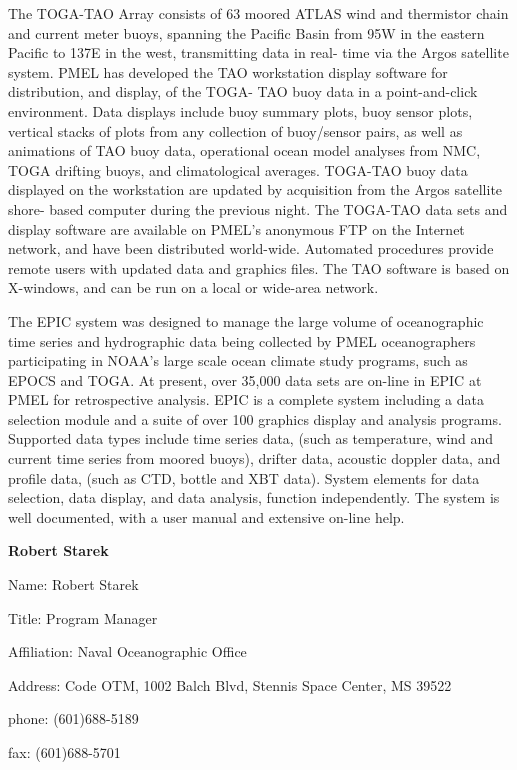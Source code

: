 	The TOGA-TAO Array consists of 63 moored ATLAS wind and 
thermistor chain and current meter buoys, spanning the Pacific Basin from 
95W in the eastern Pacific to 137E in the west, transmitting data in real-
time via the Argos satellite system.  PMEL has developed the TAO 
workstation display software for distribution, and display, of the TOGA-
TAO buoy data in a point-and-click environment.  Data displays include 
buoy summary plots, buoy sensor plots, vertical stacks of plots from any 
collection of buoy/sensor pairs, as well as animations of TAO buoy data, 
operational ocean model analyses from NMC, TOGA drifting buoys, and 
climatological averages.  TOGA-TAO buoy data displayed on the 
workstation are updated by acquisition from the Argos satellite shore-
based computer during the previous night.  The TOGA-TAO data sets and 
display software are available on PMEL's anonymous FTP on the Internet 
network, and have been distributed world-wide.  Automated procedures 
provide remote users with updated data and graphics files. The TAO 
software is based on X-windows, and can be run on a local or wide-area 
network.


\bigskip
{}
\bigskip


	The EPIC system was designed to manage the large volume of 
oceanographic time series and hydrographic data being collected by PMEL 
oceanographers participating in NOAA's large scale ocean climate study 
programs, such as EPOCS and TOGA.  At present, over 35,000 data sets are 
on-line in EPIC at PMEL for retrospective analysis.  EPIC is a complete 
system including a data selection module and a suite of over 100 graphics 
display and analysis programs.  Supported data types include time series 
data, (such as temperature, wind and current time series from moored 
buoys), drifter data, acoustic doppler data, and profile data, (such as CTD, 
bottle and XBT data).  System elements for data selection, data display, 
and data analysis, function independently.  The system is well 
documented, with a user manual and extensive on-line help.
\newpage

\begin{center}
\LARGE
{\bf  Robert Starek}
\end{center}
\large
{}
\normalsize
\smallskip
\begin{description}
\item{Name:}  Robert Starek
\item{Title:}  Program Manager
\item{Affiliation:}  Naval Oceanographic Office
\item{Address:}  Code OTM, 1002 Balch Blvd, Stennis Space Center, MS  
39522
\item{phone:}  (601)688-5189
\item{fax:}  (601)688-5701
\end{description}

